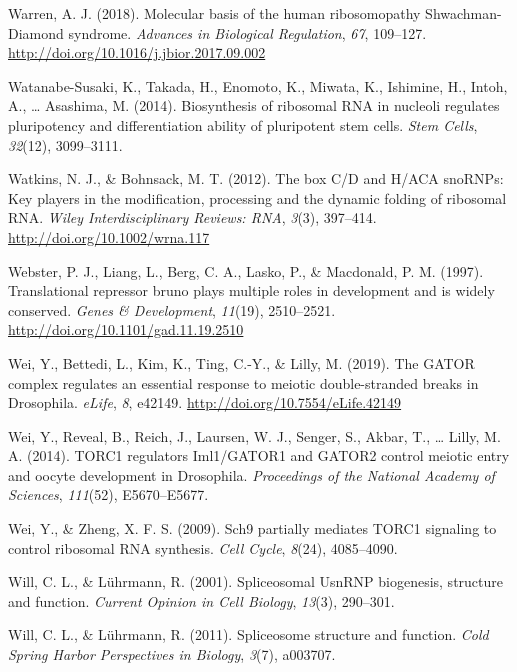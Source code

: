 \documentclass[12pt,oneside]{reedthesis}
\newlength{\cslhangindent}
\newenvironment{cslreferences}%
  {\setlength{\parindent}{0pt}%
  \everypar{\setlength{\hangindent}{\cslhangindent}}\ignorespaces}%
  {\par}
\begin{document}
\begin{cslreferences}
\leavevmode\hypertarget{ref-warrenMolecularBasisHuman2018}{}%
Warren, A. J. (2018). Molecular basis of the human ribosomopathy Shwachman-Diamond syndrome. \emph{Advances in Biological Regulation}, \emph{67}, 109--127. \url{http://doi.org/10.1016/j.jbior.2017.09.002}

\leavevmode\hypertarget{ref-WatanabeSusaki2014a}{}%
Watanabe-Susaki, K., Takada, H., Enomoto, K., Miwata, K., Ishimine, H., Intoh, A., \ldots{} Asashima, M. (2014). Biosynthesis of ribosomal RNA in nucleoli regulates pluripotency and differentiation ability of pluripotent stem cells. \emph{Stem Cells}, \emph{32}(12), 3099--3111.

\leavevmode\hypertarget{ref-Watkins2012b}{}%
Watkins, N. J., \& Bohnsack, M. T. (2012). The box C/D and H/ACA snoRNPs: Key players in the modification, processing and the dynamic folding of ribosomal RNA. \emph{Wiley Interdisciplinary Reviews: RNA}, \emph{3}(3), 397--414. \url{http://doi.org/10.1002/wrna.117}

\leavevmode\hypertarget{ref-Webster1997a}{}%
Webster, P. J., Liang, L., Berg, C. A., Lasko, P., \& Macdonald, P. M. (1997). Translational repressor bruno plays multiple roles in development and is widely conserved. \emph{Genes \& Development}, \emph{11}(19), 2510--2521. \url{http://doi.org/10.1101/gad.11.19.2510}

\leavevmode\hypertarget{ref-Wei2018a}{}%
Wei, Y., Bettedi, L., Kim, K., Ting, C.-Y., \& Lilly, M. (2019). The GATOR complex regulates an essential response to meiotic double-stranded breaks in Drosophila. \emph{eLife}, \emph{8}, e42149. \url{http://doi.org/10.7554/eLife.42149}

\leavevmode\hypertarget{ref-Wei2014b}{}%
Wei, Y., Reveal, B., Reich, J., Laursen, W. J., Senger, S., Akbar, T., \ldots{} Lilly, M. A. (2014). TORC1 regulators Iml1/GATOR1 and GATOR2 control meiotic entry and oocyte development in Drosophila. \emph{Proceedings of the National Academy of Sciences}, \emph{111}(52), E5670--E5677.

\leavevmode\hypertarget{ref-Wei2009a}{}%
Wei, Y., \& Zheng, X. F. S. (2009). Sch9 partially mediates TORC1 signaling to control ribosomal RNA synthesis. \emph{Cell Cycle}, \emph{8}(24), 4085--4090.

\leavevmode\hypertarget{ref-Will2001}{}%
Will, C. L., \& Lührmann, R. (2001). Spliceosomal UsnRNP biogenesis, structure and function. \emph{Current Opinion in Cell Biology}, \emph{13}(3), 290--301.

\leavevmode\hypertarget{ref-Will2011d}{}%
Will, C. L., \& Lührmann, R. (2011). Spliceosome structure and function. \emph{Cold Spring Harbor Perspectives in Biology}, \emph{3}(7), a003707.


\end{cslreferences}
\end{document}
